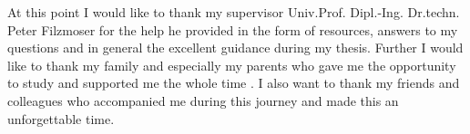 At this point I would like to thank my supervisor Univ.Prof. Dipl.-Ing. Dr.techn. Peter Filzmoser for the help he provided in the form of resources, answers to my questions and in general the excellent guidance during my thesis. Further I would like to thank my family and especially my parents who gave me the opportunity to study and supported me the whole time . I also want to thank my friends and colleagues who accompanied me during this journey and made this an unforgettable time. 